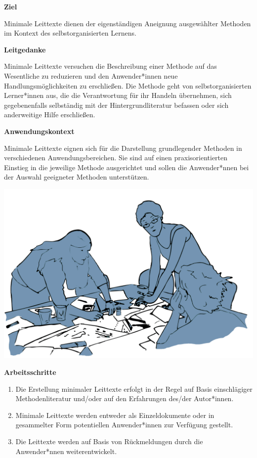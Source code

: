 \documentclass[
  a4paper,
]{book}
\providecommand{\tightlist}{%
  \setlength{\itemsep}{0pt}\setlength{\parskip}{0pt}}
\begin{document}
\textbf{Ziel}

Minimale Leittexte dienen der eigenständigen Aneignung ausgewählter Methoden im Kontext des selbstorganisierten Lernens.

\textbf{Leitgedanke}

Minimale Leittexte versuchen die Beschreibung einer Methode auf das Wesentliche zu reduzieren und den Anwender*innen neue Handlungsmöglichkeiten zu erschließen. Die Methode geht von selbstorganisierten Lerner*innen aus, die die Verantwortung für ihr Handeln übernehmen, sich gegebenenfalls selbständig mit der Hintergrundliteratur befassen oder sich anderweitige Hilfe erschließen.

\textbf{Anwendungskontext}

Minimale Leittexte eignen sich für die Darstellung grundlegender Methoden in verschiedenen Anwendungsbereichen. Sie sind auf einen praxisorientierten Einstieg in die jeweilige Methode ausgerichtet und sollen die Anwender*nnen bei der Auswahl geeigneter Methoden unterstützen.

\begin{center}\includegraphics{Figures/03-02-praktik} \end{center}

\textbf{Arbeitsschritte}

\begin{enumerate}
\def\labelenumi{\arabic{enumi}.}
\tightlist
\item
  Die Erstellung minimaler Leittexte erfolgt in der Regel auf Basis einschlägiger Methodenliteratur und/oder auf den Erfahrungen des/der Autor*innen.
\item
  Minimale Leittexte werden entweder als Einzeldokumente oder in gesammelter Form potentiellen Anwender*innen zur Verfügung gestellt.
\item
  Die Leittexte werden auf Basis von Rückmeldungen durch die Anwender*nnen weiterentwickelt.
\end{enumerate}
\end{document}
